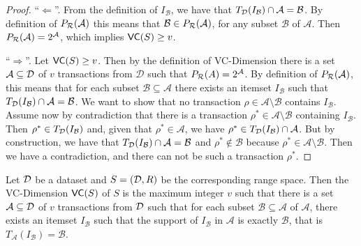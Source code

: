 \begin{proof} ``$\Leftarrow$''.
  From the definition of $I_\mathcal{B}$, we have that
  $T_{\cal D}(I_\mathcal{B})\cap\mathcal{A}=\mathcal{B}$. By definition of
  $P_{\mathcal{R}}(\mathcal{A})$ this means that $\mathcal{B}\in P_{\mathcal{R}}(\mathcal{A})$, for any
  subset $\mathcal{B}$ of $\mathcal{A}$. Then $P_{\mathcal{R}}(\mathcal{A})=2^\mathcal{A}$,
  which implies $\mathsf{VC}(S)\ge v$.

  ``$\Rightarrow$''. Let $\mathsf{VC}(S)\ge v$. Then by the definition of VC-Dimension there
  is a set $\mathcal{A}\subseteq{\cal D}$ of $v$ transactions from $\mathcal{D}$ such
  that $P_{\mathcal{R}}(A)=2^{\mathcal{A}}$. By definition of $P_{\mathcal{R}}(\mathcal{A})$, this means
  that for each subset $\mathcal{B}\subseteq\mathcal{A}$ there exists an itemset
  $I_\mathcal{B}$ such that $T_{\cal D}(I_\mathcal{B})\cap\mathcal{A}=\mathcal{B}$.
  We want to show that no transaction $\rho\in\mathcal{A}\setminus\mathcal{B}$
  contains $I_\mathcal{B}$. Assume now by contradiction that there is a
  transaction $\rho^*\in\mathcal{A}\setminus\mathcal{B}$ containing
  $I_\mathcal{B}$. Then $\rho^*\in T_{\cal D}(I_\mathcal{B})$ and, given that
  $\rho^*\in\mathcal{A}$, we have $\rho^*\in
  T_{\cal D}(I_\mathcal{B})\cap\mathcal{A}$. But by construction, we have that
  $T_{\cal D}(I_\mathcal{B})\cap\mathcal{A}=\mathcal{B}$ and
  $\rho^*\notin\mathcal{B}$ because $\rho^*\in\mathcal{A}\setminus\mathcal{B}$.
  Then we have a contradiction, and there can not be such a transaction
  $\rho^*$.
\end{proof}

\begin{corollary} Let ${\cal D}$ be a dataset and $S=({\cal D},R)$ be the corresponding
  range space. Then the VC-Dimension $\mathsf{VC}(S)$ of $S$ is the maximum integer
  $v$ such that there is a set $\mathcal{A}\subseteq{\cal D}$ of $v$ transactions
  from ${\cal D}$ such that for each subset $\mathcal{B}\subseteq\mathcal{A}$ of
  $\mathcal{A}$, there exists an itemset $I_\mathcal{B}$ such that the support
  of $I_\mathcal{B}$ in $\mathcal{A}$ is exactly $\mathcal{B}$, that is
  $T_\mathcal{A}(I_\mathcal{B})=\mathcal{B}$.
\end{corollary}

